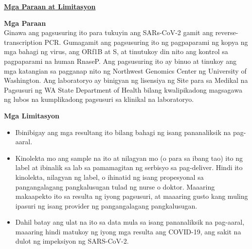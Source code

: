 \documentclass[10pt]{article}
\begin{document}
\bigskip

\large \underline{\textbf{Mga Paraan at Limitasyon}}

\textbf{Mga Paraan}\\
Ginawa ang pagsusuring ito para tukuyin ang SARs-CoV-2 gamit ang
reverse-transcription PCR. Gumagamit ang pagsusuring ito ng pagpaparami ng kopya
ng mga bahagi ng virus, ang ORf1B at S, at tinutukoy din nito ang kontrol sa
pagpaparami na human RnaseP. Ang pagsusuring ito ay binuo at tinukoy ang mga
katangian sa pagganap nito ng Northwest Genomics Center ng University of
Washington. Ang laboratoryo ay binigyan ng lisensiya ng Site para sa Medikal na
Pagsusuri ng WA State Department of Health bilang kwalipikadong magsagawa ng
lubos na kumplikadong pagsusuri sa klinikal na laboratoryo.

\textbf{Mga Limitasyon}

\begin{itemize}

\item

  Ibinibigay ang mga resultang ito bilang bahagi ng isang pananaliksik na
  pag-aaral.

\item

  Kinolekta mo ang sample na ito at nilagyan mo (o para sa ibang tao) ito ng
  label at ibinalik sa lab sa pamamagitan ng serbisyo sa pag-deliver. Hindi ito
  kinolekta, nilagyan ng label, o ihinatid ng isang propesyonal sa
  pangangalagang pangkalusugan tulad ng nurse o doktor. Maaaring makaapekto ito
  sa resulta ng iyong pagsusuri, at maaaring gusto kang muling ipasuri ng isang
  provider ng pangangalagang pangkalusugan.

\item

  Dahil batay ang ulat na ito sa data mula sa isang pananaliksik na pag-aaral,
  maaaring hindi matukoy ng iyong mga resulta ang COVID-19, ang sakit na dulot
  ng impeksiyon ng SARS-CoV-2.

\end{itemize}
\end{document}
